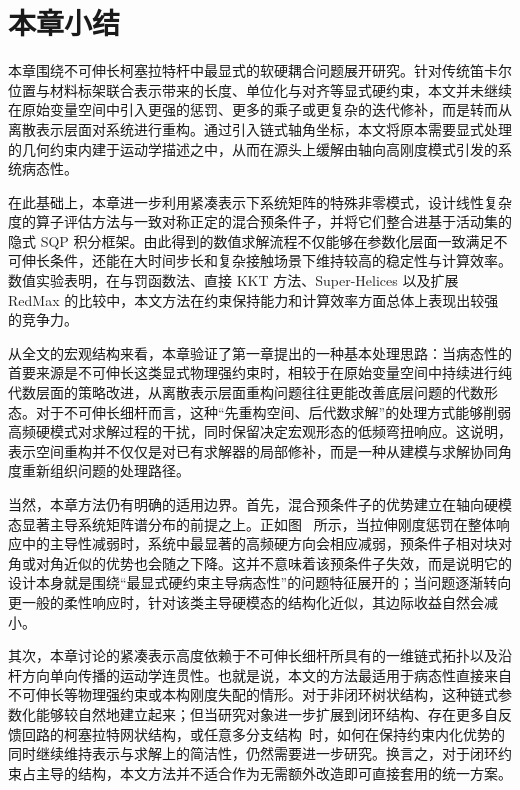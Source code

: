 \section{本章小结}

本章围绕不可伸长柯塞拉特杆中最显式的软硬耦合问题展开研究。针对传统笛卡尔位置与材料标架联合表示带来的长度、单位化与对齐等显式硬约束，本文并未继续在原始变量空间中引入更强的惩罚、更多的乘子或更复杂的迭代修补，而是转而从离散表示层面对系统进行重构。通过引入链式轴角坐标，本文将原本需要显式处理的几何约束内建于运动学描述之中，从而在源头上缓解由轴向高刚度模式引发的系统病态性。

在此基础上，本章进一步利用紧凑表示下系统矩阵的特殊非零模式，设计线性复杂度的算子评估方法与一致对称正定的混合预条件子，并将它们整合进基于活动集的隐式 SQP 积分框架。由此得到的数值求解流程不仅能够在参数化层面一致满足不可伸长条件，还能在大时间步长和复杂接触场景下维持较高的稳定性与计算效率。数值实验表明，在与罚函数法、直接 KKT 方法、Super-Helices 以及扩展 RedMax 的比较中，本文方法在约束保持能力和计算效率方面总体上表现出较强的竞争力。

从全文的宏观结构来看，本章验证了第一章提出的一种基本处理思路：当病态性的首要来源是不可伸长这类显式物理强约束时，相较于在原始变量空间中持续进行纯代数层面的策略改进，从离散表示层面重构问题往往更能改善底层问题的代数形态。对于不可伸长细杆而言，这种“先重构空间、后代数求解”的处理方式能够削弱高频硬模式对求解过程的干扰，同时保留决定宏观形态的低频弯扭响应。这说明，表示空间重构并不仅仅是对已有求解器的局部修补，而是一种从建模与求解协同角度重新组织问题的处理路径。

当然，本章方法仍有明确的适用边界。首先，混合预条件子的优势建立在轴向硬模态显著主导系统矩阵谱分布的前提之上。正如图~ 所示，当拉伸刚度惩罚在整体响应中的主导性减弱时，系统中最显著的高频硬方向会相应减弱，预条件子相对块对角或对角近似的优势也会随之下降。这并不意味着该预条件子失效，而是说明它的设计本身就是围绕“最显式硬约束主导病态性”的问题特征展开的；当问题逐渐转向更一般的柔性响应时，针对该类主导硬模态的结构化近似，其边际收益自然会减小。

其次，本章讨论的紧凑表示高度依赖于不可伸长细杆所具有的一维链式拓扑以及沿杆方向单向传播的运动学连贯性。也就是说，本文的方法最适用于病态性直接来自不可伸长等物理强约束或本构刚度失配的情形。对于非闭环树状结构，这种链式参数化能够较自然地建立起来；但当研究对象进一步扩展到闭环结构、存在更多自反馈回路的柯塞拉特网状结构，或任意多分支结构~\cite{spillmann2008cosseratnet,deul_direct_2018}时，如何在保持约束内化优势的同时继续维持表示与求解上的简洁性，仍然需要进一步研究。换言之，对于闭环约束占主导的结构，本文方法并不适合作为无需额外改造即可直接套用的统一方案。

